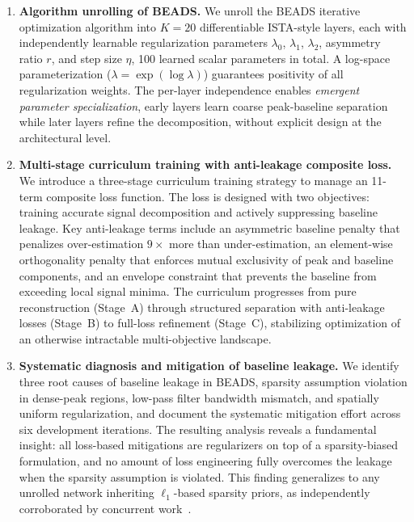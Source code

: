 \begin{enumerate}
    \item \textbf{Algorithm unrolling of BEADS.} We unroll the BEADS iterative optimization algorithm into $K{=}20$ differentiable ISTA-style layers, each with independently learnable regularization parameters $\lambda_0$, $\lambda_1$, $\lambda_2$, asymmetry ratio $r$, and step size $\eta$, 100 learned scalar parameters in total. A log-space parameterization ($\lambda = \exp(\log \lambda)$) guarantees positivity of all regularization weights. The per-layer independence enables \emph{emergent parameter specialization}, early layers learn coarse peak-baseline separation while later layers refine the decomposition, without explicit design at the architectural level.

    \item \textbf{Multi-stage curriculum training with anti-leakage composite loss.} We introduce a three-stage curriculum training strategy to manage an 11-term composite loss function. The loss is designed with two objectives: training accurate signal decomposition and actively suppressing baseline leakage. Key anti-leakage terms include an asymmetric baseline penalty that penalizes over-estimation $9{\times}$ more than under-estimation, an element-wise orthogonality penalty that enforces mutual exclusivity of peak and baseline components, and an envelope constraint that prevents the baseline from exceeding local signal minima. The curriculum progresses from pure reconstruction (Stage~A) through structured separation with anti-leakage losses (Stage~B) to full-loss refinement (Stage~C), stabilizing optimization of an otherwise intractable multi-objective landscape.

    \item \textbf{Systematic diagnosis and mitigation of baseline leakage.} We identify three root causes of baseline leakage in BEADS, sparsity assumption violation in dense-peak regions, low-pass filter bandwidth mismatch, and spatially uniform regularization, and document the systematic mitigation effort across six development iterations. The resulting analysis reveals a fundamental insight: all loss-based mitigations are regularizers on top of a sparsity-biased formulation, and no amount of loss engineering fully overcomes the leakage when the sparsity assumption is violated. This finding generalizes to any unrolled network inheriting $\ell_1$-based sparsity priors, as independently corroborated by concurrent work~\cite{gharbi2024unrolled, diras2025}.


\end{enumerate}
